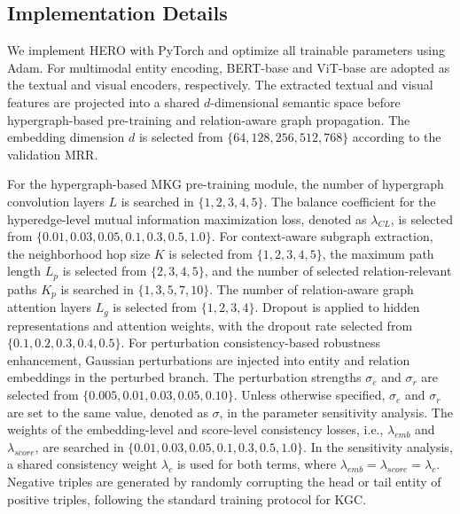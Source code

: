 \documentclass[a4paper,fleqn]{cas-sc}
\begin{document}
\subsection{Implementation Details}

We implement HERO with PyTorch and optimize all trainable parameters using Adam. For multimodal entity encoding, BERT-base and ViT-base are adopted as the textual and visual encoders, respectively. The extracted textual and visual features are projected into a shared $d$-dimensional semantic space before hypergraph-based pre-training and relation-aware graph propagation. The embedding dimension $d$ is selected from $\{64,128,256,512,768\}$ according to the validation MRR.

For the hypergraph-based MKG pre-training module, the number of hypergraph convolution layers $L$ is searched in $\{1,2,3,4,5\}$. The balance coefficient for the hyperedge-level mutual information maximization loss, denoted as $\lambda_{CL}$, is selected from $\{0.01,0.03,0.05,0.1,0.3,0.5,1.0\}$. For context-aware subgraph extraction, the neighborhood hop size $K$ is selected from $\{1,2,3,4,5\}$, the maximum path length $L_p$ is selected from $\{2,3,4,5\}$, and the number of selected relation-relevant paths $K_p$ is searched in $\{1,3,5,7,10\}$. The number of relation-aware graph attention layers $L_g$ is selected from $\{1,2,3,4\}$. Dropout is applied to hidden representations and attention weights, with the dropout rate selected from $\{0.1,0.2,0.3,0.4,0.5\}$.
For perturbation consistency-based robustness enhancement, Gaussian perturbations are injected into entity and relation embeddings in the perturbed branch. The perturbation strengths $\sigma_e$ and $\sigma_r$ are selected from $\{0.005,0.01,0.03,0.05,0.10\}$. Unless otherwise specified, $\sigma_e$ and $\sigma_r$ are set to the same value, denoted as $\sigma$, in the parameter sensitivity analysis. The weights of the embedding-level and score-level consistency losses, i.e., $\lambda_{emb}$ and $\lambda_{score}$, are searched in $\{0.01,0.03,0.05,0.1,0.3,0.5,1.0\}$. In the sensitivity analysis, a shared consistency weight $\lambda_c$ is used for both terms, where $\lambda_{emb}=\lambda_{score}=\lambda_c$. Negative triples are generated by randomly corrupting the head or tail entity of positive triples, following the standard training protocol for KGC.
\end{document}
